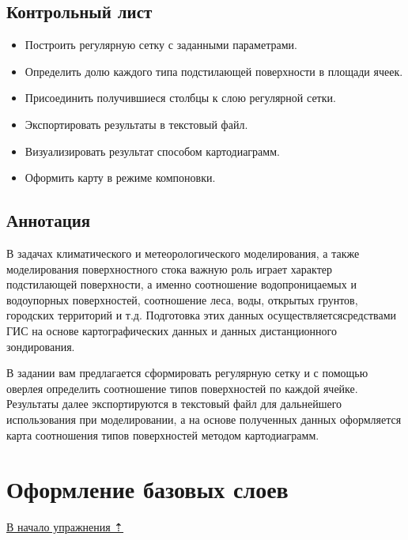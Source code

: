 \documentclass[12pt,]{book}
\providecommand{\tightlist}{%
  \setlength{\itemsep}{0pt}\setlength{\parskip}{0pt}}
\begin{document}
\hypertarget{land-cover-hydro-control}{%
\subsection{Контрольный лист}\label{land-cover-hydro-control}}

\begin{itemize}
\tightlist
\item
  Построить регулярную сетку с заданными параметрами.
\item
  Определить долю каждого типа подстилающей поверхности в площади ячеек.
\item
  Присоединить получившиеся столбцы к слою регулярной сетки.
\item
  Экспортировать результаты в текстовый файл.
\item
  Визуализировать результат способом картодиаграмм.
\item
  Оформить карту в режиме компоновки.
\end{itemize}

\hypertarget{land-cover-hydro-annotation}{%
\subsection{Аннотация}\label{land-cover-hydro-annotation}}

В задачах климатического и метеорологического моделирования, а также моделирования поверхностного стока важную роль играет характер подстилающей поверхности, а именно соотношение водопроницаемых и водоупорных поверхностей, соотношение леса, воды, открытых грунтов, городских территорий и т.д. Подготовка этих данных осуществляетсясредствами ГИС на основе картографических данных и данных дистанционного зондирования.

В задании вам предлагается сформировать регулярную сетку и с помощью оверлея определить соотношение типов поверхностей по каждой ячейке. Результаты далее экспортируются в текстовый файл для дальнейшего использования при моделировании, а на основе полученных данных оформляется карта соотношения типов поверхностей методом картодиаграмм.

\hypertarget{land-cover-hydro-base}{%
\section{Оформление базовых слоев}\label{land-cover-hydro-base}}

\protect\hyperlink{land-cover-hydro}{В начало упражнения ⇡}
\end{document}
